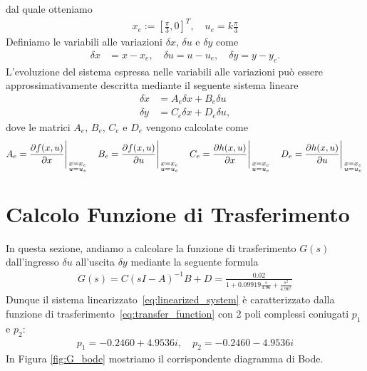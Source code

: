 \documentclass[a4paper, 11pt]{article}
\begin{document}
%
dal quale otteniamo
%
\begin{align}
	x_e := \left[\frac{\pi}{3}, 0\right]^T,  \quad u_e = k\frac{\pi}{3}\label{eq:equilibirum_pair}
\end{align}
%
Definiamo le variabili alle variazioni $\delta x$, $\delta u$ e $\delta y$ come 
%
\begin{align*}
	\delta x & = x-x_e, 
	\quad
	\delta u = u-u_e, 
	\quad
	\delta y = y-y_e.
\end{align*}
%
L'evoluzione del sistema espressa nelle variabili alle variazioni pu\`o essere approssimativamente descritta mediante il seguente sistema lineare
%
\begin{subequations}\label{eq:linearized_system}
	\begin{align}
		\delta \dot{x} & = A_e\delta x + B_e\delta u
		\\
		\delta y       & = C_e\delta x + D_e\delta u,
	\end{align}
\end{subequations}
%
dove le matrici $A_e$, $B_e$, $C_e$ e $D_e$ vengono calcolate come
\\
\begin{gather}\label{eq:matrices}\centering
	A_e = \frac{\partial f(x, u)}{\partial x} \Bigg|_{\begin{smallmatrix}
			x = x_e
			\\
			u = u_e \end{smallmatrix}}
	\quad
	B_e = \frac{\partial f(x, u)}{\partial u} \Bigg|_{\begin{smallmatrix}
			x = x_e
			\\
			u = u_e \end{smallmatrix}}
	\quad
	C_e = \frac{\partial h(x, u)}{\partial x} \Bigg|_{\begin{smallmatrix}
			x = x_e
			\\
			u = u_e \end{smallmatrix}}
	\quad
	D_e = \frac{\partial h(x, u)}{\partial u} \Bigg|_{\begin{smallmatrix}
			x = x_e
			\\
			u = u_e \end{smallmatrix}}
\end{gather}
%
\section{Calcolo Funzione di Trasferimento}

In questa sezione, andiamo a calcolare la funzione di trasferimento $G(s)$ dall'ingresso $\delta u$ all'uscita $\delta y$ mediante la seguente formula 
%
%
\begin{align}\label{eq:transfer_function}
	G(s) = C(sI-A)^{-1}B + D = \frac{0.02}{1+0.09919\frac{s}{4.96}+\frac{s^2}{4.96^2}}
\end{align}
%
Dunque il sistema linearizzato~\eqref{eq:linearized_system} è caratterizzato dalla funzione di trasferimento~\eqref{eq:transfer_function} con 2 poli complessi coniugati $p_1$ e $p_2$:
\begin{align}
	p_1 = -0.2460 + 4.9536i, \quad p_2 = -0.2460 - 4.9536i
\end{align}
In Figura \ref{fig:G_bode} mostriamo il corrispondente diagramma di Bode. 
\end{document}
